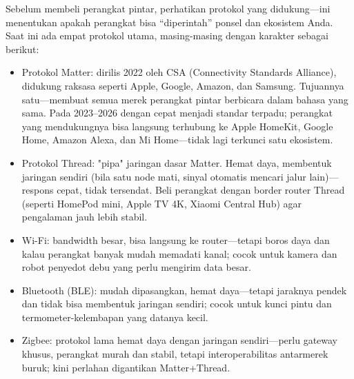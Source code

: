 


Sebelum membeli perangkat pintar, perhatikan protokol yang didukung—ini menentukan apakah perangkat bisa “diperintah” ponsel dan ekosistem Anda. Saat ini ada empat protokol utama, masing-masing dengan karakter sebagai berikut:

\begin{itemize}
  \item Protokol Matter: dirilis 2022 oleh CSA (Connectivity Standards Alliance), didukung raksasa seperti Apple, Google, Amazon, dan Samsung. Tujuannya satu—membuat semua merek perangkat pintar berbicara dalam bahasa yang sama. Pada 2023–2026 dengan cepat menjadi standar terpadu; perangkat yang mendukungnya bisa langsung terhubung ke Apple HomeKit, Google Home, Amazon Alexa, dan Mi Home—tidak lagi terkunci satu ekosistem.
  \item Protokol Thread: "pipa" jaringan dasar Matter. Hemat daya, membentuk jaringan sendiri (bila satu node mati, sinyal otomatis mencari jalur lain)—respons cepat, tidak tersendat. Beli perangkat dengan border router Thread (seperti HomePod mini, Apple TV 4K, Xiaomi Central Hub) agar pengalaman jauh lebih stabil.
  \item Wi-Fi: bandwidth besar, bisa langsung ke router—tetapi boros daya dan kalau perangkat banyak mudah memadati kanal; cocok untuk kamera dan robot penyedot debu yang perlu mengirim data besar.
  \item Bluetooth (BLE): mudah dipasangkan, hemat daya—tetapi jaraknya pendek dan tidak bisa membentuk jaringan sendiri; cocok untuk kunci pintu dan termometer-kelembapan yang datanya kecil.
  \item Zigbee: protokol lama hemat daya dengan jaringan sendiri—perlu gateway khusus, perangkat murah dan stabil, tetapi interoperabilitas antarmerek buruk; kini perlahan digantikan Matter+Thread.
\end{itemize}

